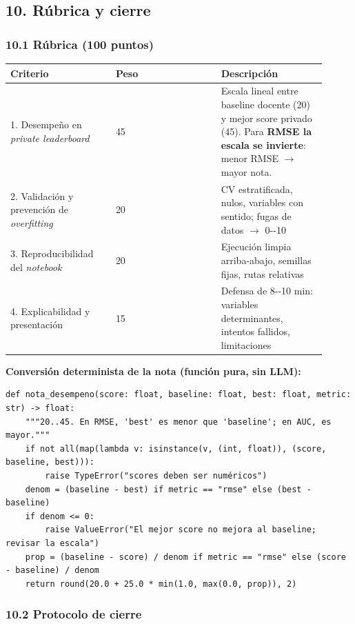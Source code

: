 \documentclass[11pt,a4paper]{article}
\begin{document}
\hypertarget{10-ruxfabrica-y-cierre}{%
\subsection{10. Rúbrica y cierre}\label{10-ruxfabrica-y-cierre}}

\hypertarget{101-ruxfabrica-100-puntos}{%
\subsubsection{10.1 Rúbrica (100 puntos)}\label{101-ruxfabrica-100-puntos}}

\begin{longtable}[]{@{}p{0.302\linewidth}p{0.302\linewidth}p{0.302\linewidth}@{}}
\toprule
Criterio & Peso & Descripción \\
\midrule
\endhead
1. Desempeño en \emph{private leaderboard} & 45 & Escala lineal entre baseline docente (20) y mejor score privado (45). Para \textbf{RMSE la escala se invierte}: menor RMSE \(\to\) mayor nota. \\
2. Validación y prevención de \emph{overfitting} & 20 & CV estratificada, nulos, variables con sentido; fugas de datos \(\to\) 0-\/-10 \\
3. Reproducibilidad del \emph{notebook} & 20 & Ejecución limpia arriba-abajo, semillas fijas, rutas relativas \\
4. Explicabilidad y presentación & 15 & Defensa de 8-\/-10 min: variables determinantes, intentos fallidos, limitaciones \\
\bottomrule
\end{longtable}

\textbf{Conversión determinista de la nota (función pura, sin LLM):}

\begin{lstlisting}
def nota_desempeno(score: float, baseline: float, best: float, metric: str) -> float:
    """20..45. En RMSE, 'best' es menor que 'baseline'; en AUC, es mayor."""
    if not all(map(lambda v: isinstance(v, (int, float)), (score, baseline, best))):
        raise TypeError("scores deben ser numéricos")
    denom = (baseline - best) if metric == "rmse" else (best - baseline)
    if denom <= 0:
        raise ValueError("El mejor score no mejora al baseline; revisar la escala")
    prop = (baseline - score) / denom if metric == "rmse" else (score - baseline) / denom
    return round(20.0 + 25.0 * min(1.0, max(0.0, prop)), 2)
\end{lstlisting}

\hypertarget{102-protocolo-de-cierre}{%
\subsubsection{10.2 Protocolo de cierre}\label{102-protocolo-de-cierre}}
\end{document}
